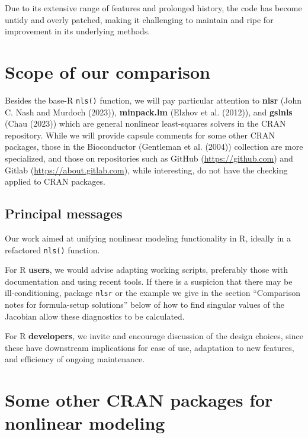 Due to its extensive range of features and prolonged history, the code has become untidy and overly patched, making it challenging to maintain and ripe for improvement in its underlying methods.

\hypertarget{scope-of-our-comparison}{%
\section{Scope of our comparison}\label{scope-of-our-comparison}}

Besides the base-R \texttt{nls()} function, we will pay particular attention
to \textbf{nlsr} (John C. Nash and Murdoch (2023)),
\textbf{minpack.lm} (Elzhov et al. (2012)), and \textbf{gslnls} (Chau (2023)) which are
general nonlinear least-squares solvers in the CRAN repository.
While we will provide capsule comments for some other CRAN packages,
those in the Bioconductor (Gentleman et al. (2004)) collection are more
specialized, and those on repositories such as
GitHub (\url{https://github.com}) and Gitlab (\url{https://about.gitlab.com}),
while interesting, do not have the checking applied to CRAN packages.

\hypertarget{principal-messages}{%
\subsection{Principal messages}\label{principal-messages}}

Our work aimed at unifying nonlinear modeling functionality in R,
ideally in a refactored \texttt{nls()} function.

For R \textbf{users}, we would advise adapting working scripts, preferably those
with documentation and using recent tools. If there is a suspicion that there
may be ill-conditioning, package \texttt{nlsr} or the example we give in the
section ``Comparison notes for formula-setup solutions'' below of how to
find singular values of the Jacobian allow these diagnostics to be calculated.

For R \textbf{developers}, we invite and encourage discussion of the design choices,
since these
have downstream implications for ease of use, adaptation to new features, and
efficiency of ongoing maintenance.

\hypertarget{some-other-cran-packages-for-nonlinear-modeling}{%
\section{Some other CRAN packages for nonlinear modeling}\label{some-other-cran-packages-for-nonlinear-modeling}}

